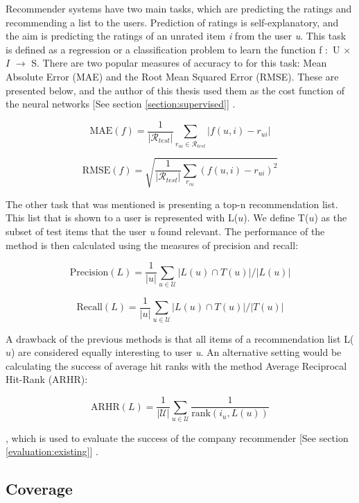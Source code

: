 Recommender systems have two main tasks, which are predicting the ratings and recommending a list to the users. Prediction of ratings is self-explanatory, and the aim is predicting the ratings of an unrated item \textit{i} from the user \textit{u}. This task is defined as a regression or a classification problem to learn the function f $\colon$ U $\times$ $I$ $\rightarrow$ S. There are two popular measures of accuracy to for this task: Mean Absolute Error (MAE) and the Root Mean Squared Error (RMSE). These are presented below, and the author of this thesis used them as the cost function of the neural networks [See section \ref{section:supervised}] \cite{shani2011evaluating}.

$$
\mathrm { MAE } ( f ) = \frac { 1 } { \left| \mathcal { R } _ {test} \right| } \sum _ { r _ { u i } \in \mathcal { R } _ {test} } \left| f ( u , i ) - r _ { u i } \right|
$$


$$
\mathrm { RMSE } ( f ) = \sqrt { \frac { 1 } { \left| \mathcal { R } _ { test} \right| } \sum _ { r _ { i u } } \left( f ( u , i ) - r _ { u i } \right) ^ { 2 } }
$$

The other task that was mentioned  is presenting a top-n recommendation list. This list that is shown to a user is represented with L($u$). We define T($u$) as the subset of test items that the user \textit{u} found relevant. The performance of the method is then calculated using the measures of precision and recall:

$$
\mathrm { Precision } ( L ) = \frac { 1 } { | u | } \sum _ { u \in \mathcal { U } } | L ( u ) \cap T ( u ) | / | L ( u ) |
$$


$$
\mathrm { Recall } ( L ) = \frac { 1 } { | u | } \sum _ { u \in \mathcal { U } } | L ( u ) \cap T ( u ) | / | T ( u ) |
$$

A drawback of the previous methods is that all items of a recommendation list L($u$) are considered equally interesting to user \textit{u}. An alternative setting would be calculating the success of average hit ranks with the method Average Reciprocal Hit-Rank (ARHR):

$$
\mathrm { ARHR } ( L ) = \frac { 1 } { | \mathcal { U } | } \sum _ { u \in \mathcal { U } } \frac { 1 } { \mathrm { rank } \left( i _ { u } , L ( u ) \right) }
$$

, which is used to evaluate the success of the company recommender [See section \ref{evaluation:existing}] \cite{shani2011evaluating}.


\subsection{Coverage}


